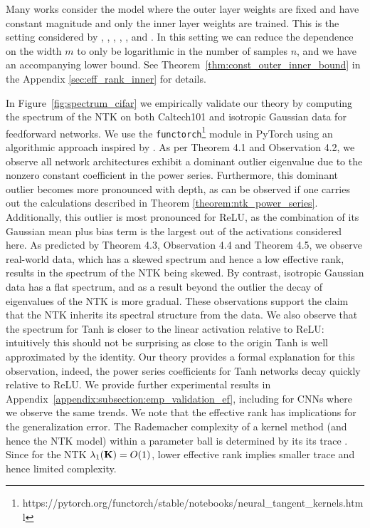 \par
Many works consider the model where the outer layer weights are fixed and have constant magnitude and only the inner layer weights are trained.  This is the setting considered by \cite{pmlr-v54-xie17a}, \cite{fine_grain_arora}, \cite{du2018gradient},  \cite{DBLP:journals/corr/abs-1906-05392}, \cite{pmlr-v108-li20j},  and \cite{solt_mod_over}.  In this setting we can reduce the dependence on the width $m$ to only be logarithmic in the number of samples $n$, and we have an accompanying lower bound.  See Theorem~\ref{thm:const_outer_inner_bound} in the Appendix \ref{sec:eff_rank_inner} for details.
\par
In Figure~\ref{fig:spectrum_cifar} we empirically validate our theory by computing the spectrum of the NTK on both Caltech101 \citep{li_andreeto_ranzato_perona_2022} and isotropic Gaussian data for feedforward networks.  We use the \texttt{functorch}\footnote{https://pytorch.org/functorch/stable/notebooks/neural\_tangent\_kernels.html} module in PyTorch \citep{NEURIPS2019_9015} using an algorithmic approach inspired by \cite{pmlr-v162-novak22a}. As per Theorem 4.1 and Observation 4.2, we observe all network architectures exhibit a dominant outlier eigenvalue due to the nonzero constant coefficient in the power series. Furthermore, this dominant outlier becomes more pronounced with depth, as can be observed if one carries out the calculations described in Theorem \ref{theorem:ntk_power_series}. Additionally, this outlier is most pronounced for ReLU, as the combination of its Gaussian mean plus bias term is the largest out of the activations considered here. As predicted by Theorem 4.3, Observation 4.4 and Theorem 4.5, we observe real-world data, which has a skewed spectrum and hence a low effective rank, results in the spectrum of the NTK being skewed. By contrast, isotropic Gaussian data has a flat spectrum, and as a result beyond the outlier the decay of eigenvalues of the NTK is more gradual. These observations support the claim that the NTK inherits its spectral structure from the data. We also observe that the spectrum for Tanh is closer to the linear activation relative to ReLU: intuitively this should not be surprising as close to the origin Tanh is well approximated by the identity. Our theory provides a formal explanation for this observation, indeed, the power series coefficients for Tanh networks decay quickly relative to ReLU. We provide further experimental results in Appendix~\ref{appendix:subsection:emp_validation_ef}, including for CNNs where we observe the same trends.  We note that the effective rank has implications for the generalization error.  The Rademacher complexity of a kernel method (and hence the NTK model) within a parameter ball is determined by its its trace \citep{journals/jmlr/BartlettM02}. Since for the NTK $\lambda_1(\mathbf{K}) = O(1)$, lower effective rank implies smaller trace and hence limited complexity.
